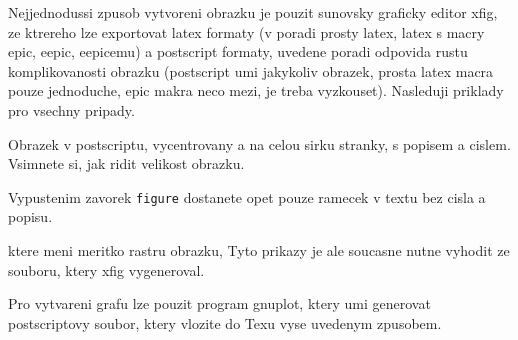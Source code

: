 \documentclass[czech]{article}
\begin{document}
Nejjednodussi zpusob vytvoreni obrazku je pouzit sunovsky graficky editor xfig,
ze ktrereho lze exportovat latex formaty (v poradi prosty latex, 
latex s macry epic, eepic, eepicemu) a postscript formaty,
uvedene poradi odpovida rustu komplikovanosti obrazku
(postscript umi jakykoliv obrazek, prosta latex macra pouze jednoduche,
epic makra neco mezi, je treba vyzkouset). Nasleduji priklady
pro vsechny pripady. 

Obrazek v postscriptu, vycentrovany a na celou sirku stranky, 
s popisem a cislem. Vsimnete si, jak ridit velikost obrazku.


%
Vypustenim zavorek {\tt figure} dostanete opet pouze ramecek 
v textu bez cisla a popisu. 

%
ktere meni meritko rastru obrazku, Tyto prikazy je ale soucasne 
nutne vyhodit ze souboru, ktery xfig vygeneroval.

Pro vytvareni grafu lze pouzit program gnuplot, ktery umi generovat postscriptovy soubor, ktery vlozite
do Texu vyse uvedenym zpusobem.
\end{document}
